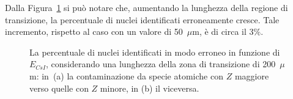 Dalla Figura~\ref{fig:leakage_res_200um} si può notare che, aumentando la lunghezza della regione di transizione, la percentuale di nuclei identificati erroneamente cresce.
Tale incremento, rispetto al caso con un valore di 50~$\mu$m, è di circa il 3\%.



\begin{figure}[!p] 
	\centering
	\hspace{10mm}
	\caption{La percentuale di nuclei identificati in modo erroneo in funzione di $E_{CsI}$, considerando una lunghezza della zona di transizione di 200~$\mu$m: in~(a) la contaminazione da specie atomiche con $Z$ maggiore verso quelle con $Z$ minore, in (b) il viceversa.} \label{fig:leakage_res_200um}
\end{figure}



